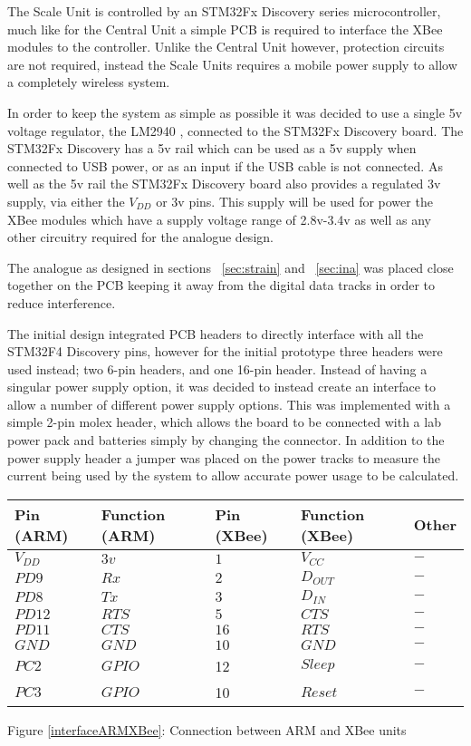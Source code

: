 The Scale Unit is controlled by an STM32Fx Discovery series microcontroller, much like for the Central Unit a simple PCB is required to interface the XBee modules to the controller.  Unlike the Central Unit however, protection circuits are not required, instead the Scale Units requires a mobile power supply to allow a completely wireless system.

In order to keep the system as simple as possible it was decided to use a single 5v voltage regulator, the LM2940 \cite{LM2940}, connected to the STM32Fx Discovery board. The STM32Fx Discovery has a 5v rail which can be used as a 5v supply when connected to USB power, or as an input if the USB cable is not connected. As well as the 5v rail the STM32Fx Discovery board also provides a regulated 3v supply, via either the $V_{DD}$ or 3v pins. This supply will be used for power the XBee modules which have a supply voltage range of 2.8v-3.4v as well as any other circuitry required for the analogue design.

The analogue as designed in sections ~\ref{sec:strain} and ~\ref{sec:ina} was placed close together on the PCB keeping it away from the digital data tracks in order to reduce interference.

The initial design integrated PCB headers to directly interface with all the STM32F4 Discovery pins, however for the initial prototype three headers were used instead; two 6-pin headers, and one 16-pin header. Instead of having a singular power supply option, it was decided to instead create an interface to allow a number of different power supply options. This was implemented with a simple 2-pin molex header, which allows the board to be connected with a lab power pack and batteries simply by changing the connector. In addition to the power supply header a jumper was placed on the power tracks to measure the current being used by the system to allow accurate power usage to be calculated.

\begin{center}
  \begin{tabular}{| l | l | l | l | l |}
    \hline
    \bf{Pin (ARM)} & \bf{Function (ARM)} & \bf{Pin (XBee)} & \bf{Function (XBee)}  & \bf{Other}\\ \hline
         $V_{DD}$ & $3v $& $1 $& $V_{CC} $& $ - $\\ \hline
	 $PD9$ & \(Rx\) &$ 2$ &$ D_{OUT}$ &$ - $\\ \hline
	 $PD8 $& \(Tx\) &$ 3$ &$ D_{IN}$ & $- $\\ \hline
	 $PD12$ & \(RTS\) & $5$ & $CTS$ &$ - $ \\ \hline
	 $PD11$ & $CTS$ & $16$ & $RTS$ & $-$ \\ \hline
	 $GND$ & \(GND\) & $10$ & \(GND\) & $-$\\ \hline
	$PC2 $ & \(GPIO\) & 12 & \(Sleep\) & $-$\\ \hline
	$PC3 $ & \(GPIO\) & 10 & \(Reset\) & $-$ \\
    \hline
  \end{tabular}
\label{interfaceARMXBee}

Figure \ref{interfaceARMXBee}: Connection between ARM and XBee units
\end{center}